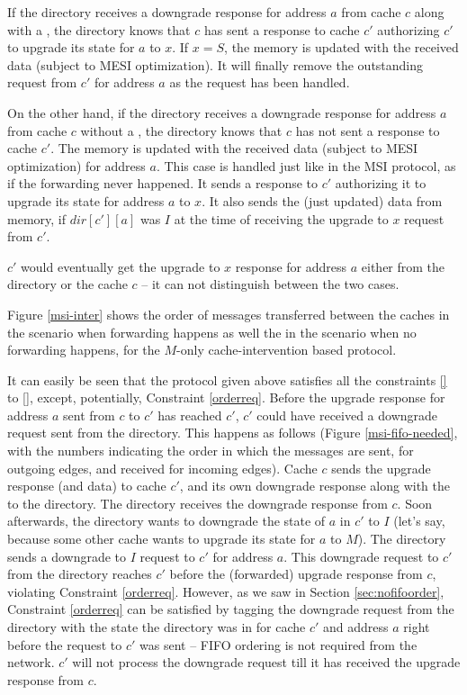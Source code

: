 If the directory receives a downgrade response for address $a$ from cache $c$
along with a \FwdAck{}, the directory knows that $c$ has sent a response to
cache $c'$ authorizing $c'$ to upgrade its state for $a$ to $x$. If $x = S$, the
memory is updated with the received data (subject to MESI optimization). It will
finally remove the outstanding request from $c'$ for address $a$ as the request
has been handled.

On the other hand, if the directory receives a downgrade response for address
$a$ from cache $c$ without a \FwdAck{}, the directory knows that $c$ has not
sent a response to cache $c'$. The memory is updated with the received data
(subject to MESI optimization) for address $a$. This case is handled just like
in the MSI protocol, as if the forwarding never happened. It sends a
response to $c'$ authorizing it to upgrade its state for address $a$ to $x$. It
also sends the (just updated) data from memory, if $dir[c'][a]$ was $I$ at the
time of receiving the upgrade to $x$ request from $c'$.

$c'$ would eventually get the upgrade to $x$ response for address $a$ either
from the directory or the cache $c$ -- it can not distinguish between the two
cases.

Figure \ref{msi-inter} shows the order of messages transferred between the
caches in the scenario when forwarding happens as well the in the scenario when
no forwarding happens, for the $M$-only cache-intervention based protocol.


It can easily be seen that the protocol given above satisfies all the
constraints \ref{} to \ref{}, except, potentially, Constraint \ref{orderreq}.
Before the upgrade response for address $a$ sent from $c$ to $c'$ has reached
$c'$, $c'$ could have received a downgrade request sent from the directory. This
happens as follows (Figure \ref{msi-fifo-needed}, with the numbers indicating
the order in which the messages are sent, for outgoing edges, and received for
incoming edges). Cache $c$ sends the upgrade response (and data) to cache $c'$,
and its own downgrade response along with the \FwdAck{} to the directory. The
directory receives the downgrade response from $c$. Soon afterwards, the
directory wants to downgrade the state of $a$ in $c'$ to $I$ (let's say, because
some other cache wants to upgrade its state for $a$ to $M$).  The directory
sends a downgrade to $I$ request to $c'$ for address $a$. This downgrade request
to $c'$ from the directory reaches $c'$ before the (forwarded) upgrade response
from $c$, violating Constraint \ref{orderreq}. However, as we saw in Section
\ref{sec:nofifoorder}, Constraint \ref{orderreq} can be satisfied by tagging the
downgrade request from the directory with the state the directory was in for
cache $c'$ and address $a$ right before the request to $c'$ was sent -- FIFO
ordering is not required from the network. $c'$ will not process the downgrade
request till it has received the upgrade response from $c$.

